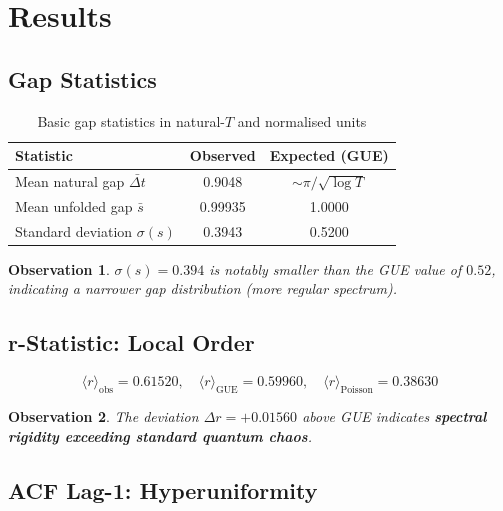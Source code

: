 \documentclass[12pt, a4paper]{article}
\newtheorem{observation}{Observation}
\begin{document}
\section{Results}

\subsection{Gap Statistics}

\begin{table}[H]
\centering
\caption{Basic gap statistics in natural-$T$ and normalised units}
\begin{tabular}{lcc}
\toprule
\textbf{Statistic} & \textbf{Observed} & \textbf{Expected (GUE)} \\
\midrule
Mean natural gap $\bar{\Delta t}$  & 0.9048 & $\sim \pi/\sqrt{\log T}$ \\
Mean unfolded gap $\bar{s}$        & 0.99935 & 1.0000 \\
Standard deviation $\sigma(s)$     & 0.3943  & 0.5200 \\
\bottomrule
\end{tabular}
\end{table}

\begin{observation}
$\sigma(s) = 0.394$ is notably smaller than the GUE value of $0.52$,
indicating a narrower gap distribution (more regular spectrum).
\end{observation}

\subsection{r-Statistic: Local Order}

\[
  \langle r \rangle_{\text{obs}} = 0.61520, \quad
  \langle r \rangle_{\text{GUE}} = 0.59960, \quad
  \langle r \rangle_{\text{Poisson}} = 0.38630
\]

\begin{observation}
The deviation $\Delta r = +0.01560$ above GUE indicates \textbf{spectral
rigidity exceeding standard quantum chaos}.
\end{observation}

\subsection{ACF Lag-1: Hyperuniformity}
\end{document}
